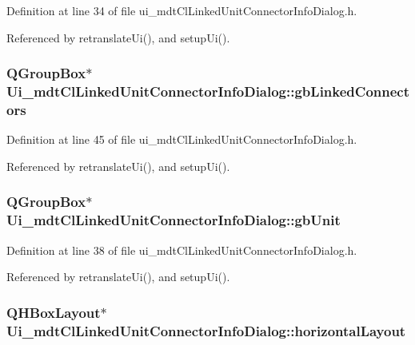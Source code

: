 Definition at line 34 of file ui\-\_\-mdt\-Cl\-Linked\-Unit\-Connector\-Info\-Dialog.\-h.



Referenced by retranslate\-Ui(), and setup\-Ui().

\hypertarget{class_ui__mdt_cl_linked_unit_connector_info_dialog_a8274bed7b1d6fbfa75c426615f03d0a3}{
\subsubsection[{gb\-Linked\-Connectors}]{\setlength{\rightskip}{0pt plus 5cm}Q\-Group\-Box$\ast$ Ui\-\_\-mdt\-Cl\-Linked\-Unit\-Connector\-Info\-Dialog\-::gb\-Linked\-Connectors}}\label{class_ui__mdt_cl_linked_unit_connector_info_dialog_a8274bed7b1d6fbfa75c426615f03d0a3}


Definition at line 45 of file ui\-\_\-mdt\-Cl\-Linked\-Unit\-Connector\-Info\-Dialog.\-h.



Referenced by retranslate\-Ui(), and setup\-Ui().

\hypertarget{class_ui__mdt_cl_linked_unit_connector_info_dialog_af1240c366303e07931f1cb607c486be6}{
\subsubsection[{gb\-Unit}]{\setlength{\rightskip}{0pt plus 5cm}Q\-Group\-Box$\ast$ Ui\-\_\-mdt\-Cl\-Linked\-Unit\-Connector\-Info\-Dialog\-::gb\-Unit}}\label{class_ui__mdt_cl_linked_unit_connector_info_dialog_af1240c366303e07931f1cb607c486be6}


Definition at line 38 of file ui\-\_\-mdt\-Cl\-Linked\-Unit\-Connector\-Info\-Dialog.\-h.



Referenced by retranslate\-Ui(), and setup\-Ui().

\hypertarget{class_ui__mdt_cl_linked_unit_connector_info_dialog_a27b7df6f0a3e1bf4f7471ecd1264bc50}{
\subsubsection[{horizontal\-Layout}]{\setlength{\rightskip}{0pt plus 5cm}Q\-H\-Box\-Layout$\ast$ Ui\-\_\-mdt\-Cl\-Linked\-Unit\-Connector\-Info\-Dialog\-::horizontal\-Layout}}\label{class_ui__mdt_cl_linked_unit_connector_info_dialog_a27b7df6f0a3e1bf4f7471ecd1264bc50}


